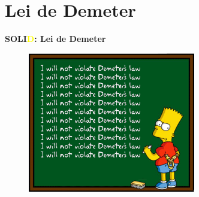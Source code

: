 \documentclass[10pt]{beamer}
\begin{document}
\section{Lei de Demeter}

\begin{frame}{\textbf{SOLI\textcolor{yellow}{D}: Lei de Demeter}}
  \begin{figure}[ht]
    \centering
      \includegraphics[width=0.65\textwidth, keepaspectratio=true]{images/simpson_demeterslaw.png}
  \end{figure}
\end{frame}

\end{document}

